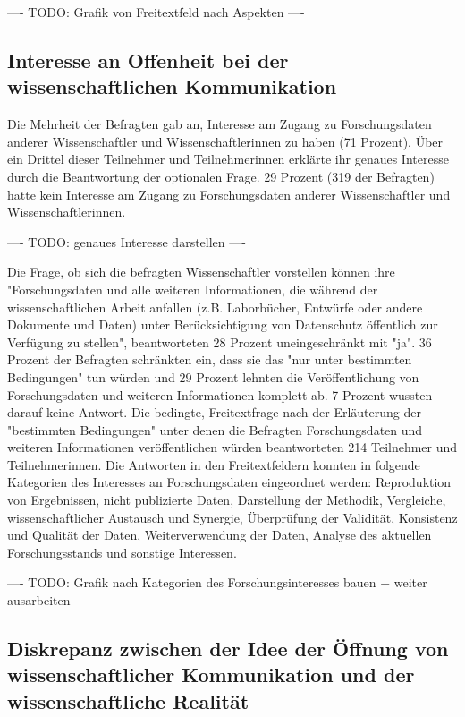 ---- TODO: Grafik von Freitextfeld nach Aspekten ----

\subsection{Interesse an Offenheit bei der wissenschaftlichen Kommunikation}

Die Mehrheit der Befragten gab an, Interesse am Zugang zu Forschungsdaten anderer Wissenschaftler und Wissenschaftlerinnen zu haben (71 Prozent). Über ein Drittel dieser Teilnehmer und Teilnehmerinnen erklärte ihr genaues Interesse durch die Beantwortung der optionalen Frage. 29 Prozent (319 der Befragten) hatte kein Interesse am Zugang zu Forschungsdaten anderer Wissenschaftler und Wissenschaftlerinnen.

---- TODO: genaues Interesse darstellen ----

Die Frage, ob sich die befragten Wissenschaftler vorstellen können ihre "Forschungsdaten und alle weiteren Informationen, die während der wissenschaftlichen Arbeit anfallen (z.B. Laborbücher, Entwürfe oder andere Dokumente und Daten) unter Berücksichtigung von Datenschutz öffentlich zur Verfügung zu stellen", beantworteten 28 Prozent uneingeschränkt mit "ja". 36 Prozent der Befragten schränkten ein, dass sie das "nur unter bestimmten Bedingungen" tun würden und 29 Prozent lehnten die Veröffentlichung von Forschungsdaten und weiteren Informationen komplett ab. 7 Prozent wussten darauf keine Antwort. Die bedingte, Freitextfrage nach der Erläuterung der "bestimmten Bedingungen" unter denen die Befragten Forschungsdaten und weiteren Informationen veröffentlichen würden beantworteten 214 Teilnehmer und Teilnehmerinnen. Die Antworten in den Freitextfeldern konnten in folgende Kategorien des Interesses an Forschungsdaten eingeordnet werden: Reproduktion von Ergebnissen, nicht publizierte Daten, Darstellung der Methodik, Vergleiche, wissenschaftlicher Austausch und Synergie, Überprüfung der Validität, Konsistenz und Qualität der Daten, Weiterverwendung der Daten, Analyse des aktuellen Forschungsstands und sonstige Interessen.

---- TODO: Grafik nach Kategorien des Forschungsinteresses bauen + weiter ausarbeiten ----

\subsection{Diskrepanz zwischen der Idee der Öffnung von wissenschaftlicher Kommunikation und der wissenschaftliche Realität}

